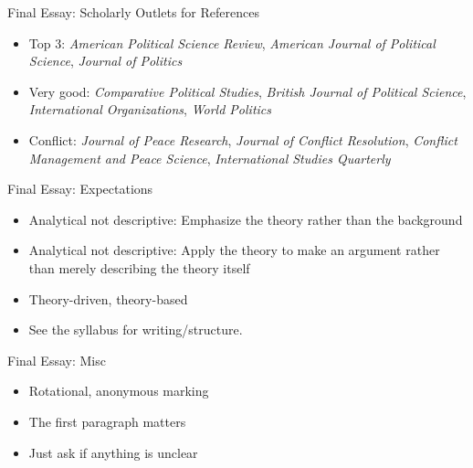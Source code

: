 \documentclass[handout]{beamer}
\begin{document}
\begin{frame}{Final Essay: Scholarly Outlets for References}
    \begin{itemize}
        \pause\item Top 3: \emph{American Political Science Review}, \emph{American Journal of Political Science}, \emph{Journal of Politics}
        \pause\item Very good: \emph{Comparative Political Studies}, \emph{British Journal of Political Science}, \emph{International Organizations}, \emph{World Politics}
        \pause\item Conflict: \emph{Journal of Peace Research}, \emph{Journal of Conflict Resolution}, \emph{Conflict Management and Peace Science}, \emph{International Studies Quarterly}
    \end{itemize}
\end{frame}

\begin{frame}{Final Essay: Expectations}
    \begin{itemize}
        \pause\item Analytical not descriptive: Emphasize the theory rather than the background
        \pause\item Analytical not descriptive: Apply the theory to make an argument rather than merely describing the theory itself
        \pause\item Theory-driven, theory-based
        \pause\item See the syllabus for writing/structure.
    \end{itemize}
\end{frame}

\begin{frame}{Final Essay: Misc}
    \begin{itemize}
        \pause\item Rotational, anonymous marking
        \pause\item The first paragraph matters
        \pause\item Just ask if anything is unclear
    \end{itemize}
\end{frame}
\end{document}
